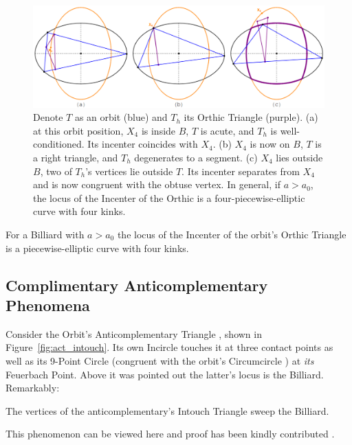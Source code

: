 \begin{figure}[H]
    \centering
    \includegraphics[width=\textwidth]{pics/0045_ort_loci_orthic.pdf}
    \caption{Denote $T$ as an orbit (blue) and $T_h$ its Orthic Triangle (purple). (a) at this orbit position, $X_4$ is inside $B$, $T$ is acute, and $T_h$ is well-conditioned. Its incenter coincides with $X_4$. (b) $X_4$ is now on $B$, $T$ is a right triangle, and $T_h$ degenerates to a segment. (c) $X_4$ lies outside $B$, two of $T_h$'s vertices lie outside $T$. Its incenter separates from $X_4$ and is now congruent with the obtuse vertex. In general, if $a>a_0$, the locus of the Incenter of the Orthic is a four-piecewise-elliptic curve with four kinks.}
    \label{fig:orthic_incenter_locus}
\end{figure}

\begin{observation}
For a Billiard with $a>a_0$ the locus of the Incenter of the orbit's Orthic Triangle is a piecewise-elliptic curve with four kinks.
\end{observation}

\subsection{Complimentary Anticomplementary Phenomena}

Consider the Orbit's Anticomplementary Triangle \cite{mw}, shown in Figure~\ref{fig:act_intouch}. Its own Incircle touches it at three contact points as well as its 9-Point Circle (congruent with the orbit's Circumcircle \cite{mw}) at {\em its} Feuerbach Point. Above it was pointed out the latter's locus is the Billiard. Remarkably:

\begin{observation}
The vertices of the anticomplementary's Intouch Triangle sweep the Billiard.
\end{observation}

\noindent This phenomenon can be viewed here \cite[video \#7]{dsr_main_videos_2019} and proof has been kindly contributed \cite{minevich17,minevich19}.

